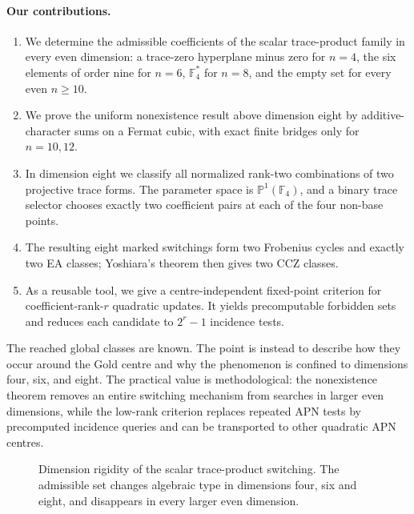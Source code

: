 \documentclass[pdflatex,sn-mathphys-num]{sn-jnl}
\theoremstyle{thmstyleone}
\theoremstyle{thmstyletwo}
\theoremstyle{thmstylethree}
\newcommand{\F}{\mathbb F}
\begin{document}
\paragraph{Our contributions.}
\begin{enumerate}
\item We determine the admissible coefficients of the scalar trace-product family in every even dimension: a trace-zero hyperplane minus zero for $n=4$, the six elements of order nine for $n=6$, $\F_4^*$ for $n=8$, and the empty set for every even $n\geq10$.
\item We prove the uniform nonexistence result above dimension eight by additive-character sums on a Fermat cubic, with exact finite bridges only for $n=10,12$.
\item In dimension eight we classify all normalized rank-two combinations of two projective trace forms. The parameter space is $\mathbb P^1(\F_4)$, and a binary trace selector chooses exactly two coefficient pairs at each of the four non-base points.
\item The resulting eight marked switchings form two Frobenius cycles and exactly two EA classes; Yoshiara's theorem \cite{Yoshiara2012} then gives two CCZ classes.
\item As a reusable tool, we give a centre-independent fixed-point criterion for coefficient-rank-$r$ quadratic updates. It yields precomputable forbidden sets and reduces each candidate to $2^r-1$ incidence tests.
\end{enumerate}
The reached global classes are known. The point is instead to describe how they occur around the Gold centre and why the phenomenon is confined to dimensions four, six, and eight. The practical value is methodological: the nonexistence theorem removes an entire switching mechanism from searches in larger even dimensions, while the low-rank criterion replaces repeated APN tests by precomputed incidence queries and can be transported to other quadratic APN centres.

\begin{figure}[ht]
\centering
{}
\caption{Dimension rigidity of the scalar trace-product switching. The admissible set changes algebraic type in dimensions four, six and eight, and disappears in every larger even dimension.}
\label{fig:dimension-ladder}
\end{figure}
\end{document}

